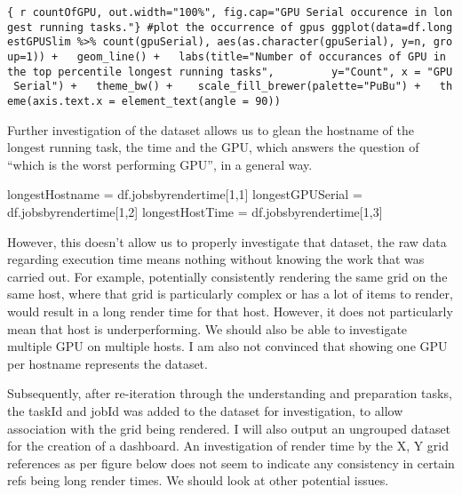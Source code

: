 \documentclass[
  twocolumn]{article}
\newenvironment{Shaded}{\begin{snugshade}}{\end{snugshade}}
\newcommand{\DecValTok}[1]{\textcolor[rgb]{0.00,0.00,0.81}{#1}}
\newcommand{\NormalTok}[1]{#1}
\newcommand{\OtherTok}[1]{\textcolor[rgb]{0.56,0.35,0.01}{#1}}
\begin{document}
\texttt{\{\ r\ countOfGPU,\ out.width="100\%",\ fig.cap="GPU\ Serial\ occurence\ in\ longest\ running\ tasks."\}\ \#plot\ the\ occurrence\ of\ gpus\ ggplot(data=df.longestGPUSlim\ \%\textgreater{}\%\ count(gpuSerial),\ aes(as.character(gpuSerial),\ y=n,\ group=1))\ +\ \ \ geom\_line()\ +\ \ \ labs(title="Number\ of\ occurances\ of\ GPU\ in\ the\ top\ percentile\ longest\ running\ tasks",\ \ \ \ \ \ \ \ \ y="Count",\ x\ =\ "GPU\ Serial")\ +\ \ \ theme\_bw()\ +\ \ \ \ scale\_fill\_brewer(palette="PuBu")\ +\ \ \ theme(axis.text.x\ =\ element\_text(angle\ =\ 90))}

Further investigation of the dataset allows us to glean the hostname of
the longest running task, the time and the GPU, which answers the
question of ``which is the worst performing GPU'', in a general way.

\begin{Shaded}
\begin{Highlighting}[]
\NormalTok{longestHostname }\OtherTok{=}\NormalTok{ df.jobsbyrendertime[}\DecValTok{1}\NormalTok{,}\DecValTok{1}\NormalTok{]}
\NormalTok{longestGPUSerial }\OtherTok{=}\NormalTok{ df.jobsbyrendertime[}\DecValTok{1}\NormalTok{,}\DecValTok{2}\NormalTok{]}
\NormalTok{longestHostTime }\OtherTok{=}\NormalTok{ df.jobsbyrendertime[}\DecValTok{1}\NormalTok{,}\DecValTok{3}\NormalTok{]}
\end{Highlighting}
\end{Shaded}

However, this doesn't allow us to properly investigate that dataset, the
raw data regarding execution time means nothing without knowing the work
that was carried out. For example, potentially consistently rendering
the same grid on the same host, where that grid is particularly complex
or has a lot of items to render, would result in a long render time for
that host. However, it does not particularly mean that host is
underperforming. We should also be able to investigate multiple GPU on
multiple hosts. I am also not convinced that showing one GPU per
hostname represents the dataset.

Subsequently, after re-iteration through the understanding and
preparation tasks, the taskId and jobId was added to the dataset for
investigation, to allow association with the grid being rendered. I will
also output an ungrouped dataset for the creation of a dashboard. An
investigation of render time by the X, Y grid references as per figure
below does not seem to indicate any consistency in certain refs being
long render times. We should look at other potential issues.
\end{document}
